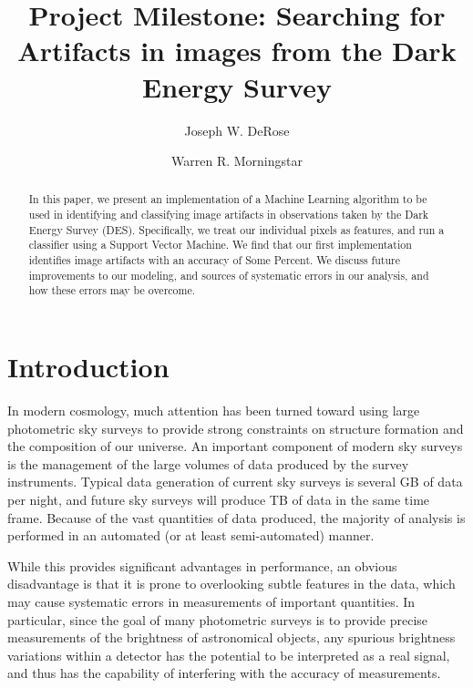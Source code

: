 \documentclass[iop,apj]{emulateapj}
\begin{document}
\title{Project Milestone:  Searching for Artifacts in images from the Dark Energy Survey}
\author{Joseph W. DeRose}
\author{Warren R. Morningstar}




\begin{abstract}
In this paper, we present an implementation of a Machine Learning algorithm
to be used in identifying and classifying image artifacts in observations taken by the Dark 
Energy Survey (DES).  Specifically, we treat our individual pixels as features, and run a 
classifier using a Support Vector Machine.  We find that our first implementation identifies
image artifacts with an accuracy of {\color{red} Some Percent}.  We discuss future improvements
to our modeling, and sources of systematic errors in our analysis, and how these errors may be 
overcome.

\end{abstract}

\section{Introduction} \label{sec:intro}

In modern cosmology, much attention has been turned toward using large photometric sky 
surveys to provide strong constraints on structure formation and the composition of our 
universe.  An important component of modern sky surveys is the management of the 
large volumes of data produced by the survey instruments.  Typical data generation of 
current sky surveys is several GB of data per night, and future sky surveys will produce
TB of data in the same time frame.  Because of the vast quantities of data produced, 
the majority of analysis is performed in an automated (or at least semi-automated) manner.

While this provides significant advantages in performance, an obvious disadvantage is that
it is prone to overlooking subtle features in the data, which may cause systematic errors
in measurements of important quantities.  In particular, since the goal of many photometric
surveys is to provide precise measurements of the brightness of astronomical objects, any
spurious brightness variations within a detector has the potential to be interpreted as a real
signal, and thus has the capability of interfering with the accuracy of measurements.
\end{document}

